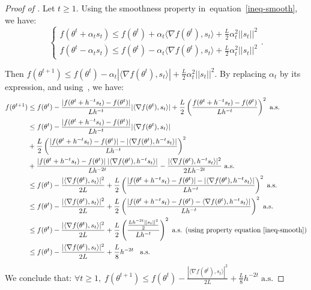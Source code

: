 \documentclass{article} %
\def\eqref#1{equation~\ref{#1}}
\begin{document}
\begin{proof}[Proof of ]

Let $t \ge 1$.
Using the smoothness property in~\eqref{ineq-smooth}, we have: 
$$
\begin{cases}
f(\theta^{t}+ \alpha_t s_t ) \le f(\theta^t)+ \alpha_t \langle \nabla f(\theta^t),s_t\rangle+\frac{L}{2} \alpha_t^2 ||s_t||^2 \\
f(\theta^{t}- \alpha_t s_t ) \le f(\theta^t)- \alpha_t \langle \nabla f(\theta^t),s_t\rangle+\frac{L}{2} \alpha_t^2 ||s_t||^2
\end{cases} .
$$

Then $f(\theta^{t+1}) \le f(\theta^t)- \alpha_t | \langle \nabla f(\theta^t),s_t \rangle| +\frac{L}{2} \alpha_t^2 ||s_t||^2$. By replacing $\alpha_t$ by its expression, and using~, we have: 
\begin{align*}
      f(\theta^{t+1}) &\le f(\theta^t)- \frac{|f(\theta^t+h^{-t} s_t)-f(\theta^t) |}{L h^{-t}} | \langle \nabla f(\theta^t),s_t \rangle|+\frac{L}{2} \left(\frac{f(\theta^t+h^{-t} s_t)-f(\theta^t) }{L h^{-t}} \right)^2 \text{ a.s.} \\
       &\le f(\theta^t)- \frac{|f(\theta^t+h^{-t} s_t)-f(\theta^t) |}{L h^{-t}} | \langle \nabla f(\theta^t),s_t \rangle|\\&+\frac{L}{2} \left( \frac{\lvert f(\theta^t+h^{-t}s_t )-f(\theta^t)\rvert- \lvert\langle \nabla f(\theta^t),h^{-t}s_t \rangle \rvert }{Lh^{-t}}  \right)^2\\&+\frac{ |f(\theta^t+h^{-t}s_t )-f(\theta^t)|\; | \langle \nabla f(\theta^t),h^{-t}s_t \rangle| }{Lh^{-2t}}-\frac{  |\langle \nabla f(\theta^t),h^{-t}s_t\rangle|^2 }{2L h^{-2t}}\text{ a.s.}
\\
      &\le f(\theta^t)-\frac{  |\langle \nabla f(\theta^t),s_t\rangle|^2 }{2L}+\frac{L}{2} \left( \frac{|f(\theta^t+h^{-t}s_t )-f(\theta^t)|- |\langle \nabla f(\theta^t),h^{-t}s_t \rangle|  }{Lh^{-t}}  \right)^2\text{ a.s.}
      \\
      &\le f(\theta^t)-\frac{  |\langle \nabla f(\theta^t),s_t\rangle|^2 }{2L}+\frac{L}{2} \left( \frac{|f(\theta^t+h^{-t}s_t )-f(\theta^t)- \langle \nabla f(\theta^t),h^{-t}s_t \rangle | }{Lh^{-t}}  \right)^2 \text{ a.s.}
            \\
      &\le f(\theta^t)-\frac{  |\langle \nabla f(\theta^t),s_t\rangle|^2 }{2L}+\frac{L}{2} \left( \frac{ \frac{L h^{-2t} ||s_t||^2 }{2}   }{Lh^{-t}}  \right)^2 \text{ a.s.  }  (\text{using property~\eqref{ineq-smooth}} )
      \\ &\le  f(\theta^t)-\frac{  |\langle \nabla f(\theta^t),s_t\rangle|^2 }{2L}+\frac{L}{8}h^{-2t}\;\; \text{ a.s.  }
    \end{align*}
  We conclude that: $\forall t \ge 1,\;  f(\theta^{t+1}) \le  f(\theta^t)-\frac{  |\langle \nabla f(\theta^t),s_t\rangle|^2 }{2L}+\frac{L}{8}h^{-2t}\; \text{a.s.} $ 
\end{proof}
\end{document}
